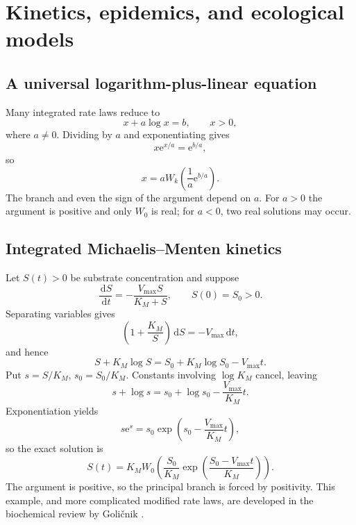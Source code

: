 \documentclass[11pt,openany]{book}
\newcommand{\e}{\mathrm{e}}
\newcommand{\dd}{\,\mathrm{d}}
\theoremstyle{plain}
\theoremstyle{definition}
\theoremstyle{remark}
\begin{document}
\chapter{Kinetics, epidemics, and ecological models}\label{chap:biology}

\section{A universal logarithm-plus-linear equation}
Many integrated rate laws reduce to
\begin{equation}\label{eq:xalogx}
              x+a\log x=b,
              \qquad x>0,
\end{equation}
where \(a\ne0\).  Dividing by \(a\) and exponentiating gives
\[
       x\e^{x/a}=\e^{b/a},
\]
so
\begin{equation}\label{eq:xalogxsolution}
       x=aW_k\!\left(\frac1a\e^{b/a}\right).
\end{equation}
The branch and even the sign of the argument depend on \(a\).  For \(a>0\)
the argument is positive and only \(W_0\) is real; for \(a<0\), two real
solutions may occur.

\section{Integrated Michaelis--Menten kinetics}
Let \(S(t)>0\) be substrate concentration and suppose
\begin{equation}\label{eq:MM}
       \frac{\dd S}{\dd t}
       =-\frac{V_{\max}S}{K_M+S},
       \qquad S(0)=S_0>0.
\end{equation}
Separating variables gives
\[
       \left(1+\frac{K_M}{S}\right)\dd S=-V_{\max}\dd t,
\]
and hence
\[
       S+K_M\log S
       =S_0+K_M\log S_0-V_{\max}t.
\]
Put \(s=S/K_M\), \(s_0=S_0/K_M\).  Constants involving
\(\log K_M\) cancel, leaving
\[
       s+\log s=s_0+\log s_0-\frac{V_{\max}}{K_M}t.
\]
Exponentiation yields
\[
       s\e^s=s_0\exp\left(s_0-\frac{V_{\max}}{K_M}t\right),
\]
so the exact solution is
\begin{equation}\label{eq:MMsolution}
 S(t)=K_M W_0\!\left(
   \frac{S_0}{K_M}
   \exp\left(\frac{S_0-V_{\max}t}{K_M}\right)
 \right).
\end{equation}
The argument is positive, so the principal branch is forced by positivity.
This example, and more complicated modified rate laws, are developed in the
biochemical review by Goli\v{c}nik \cite{Golicnik2012}.
\end{document}
